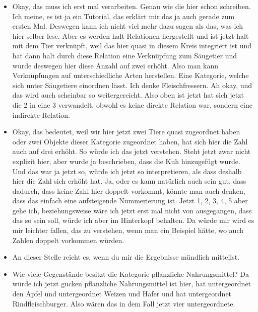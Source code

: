 {\begin{itemize}[]
            \item {} Okay, das muss ich erst mal verarbeiten.
                  Genau wie die hier schon schreiben.
                  Ich meine, es ist ja ein Tutorial, das erklärt mir das ja auch gerade zum ersten Mal.
                  Deswegen kann ich nicht viel mehr dazu sagen als das, was ich hier selber lese.
                  Aber es werden halt Relationen hergestellt und ist jetzt halt mit dem Tier verknüpft, weil das hier quasi in diesem Kreis integriert ist und hat dann halt durch diese Relation eine Verknüpfung zum Säugetier und wurde deswegen hier diese Anzahl auf zwei erhöht.
                  Also man kann Verknüpfungen auf unterschiedliche Arten herstellen.
                  Eine Kategorie, welche sich unter Säugetiere einordnen lässt.
                  Ich denke Fleischfressern. Ah okay, und das wird auch scheinbar so weitergereicht.
                  Also oben ist jetzt hat sich jetzt die 2 in eine 3 verwandelt, obwohl es keine direkte Relation war, sondern eine indirekte Relation.
            \item {} Okay, das bedeutet, weil wir hier jetzt zwei Tiere quasi zugeordnet haben oder zwei Objekte dieser Kategorie zugeordnet haben, hat sich hier die Zahl auch auf drei erhöht.
                  So würde ich das jetzt verstehen.
                  Steht jetzt zwar nicht explizit hier, aber wurde ja beschrieben, dass die Kuh hinzugefügt wurde.
                  Und das war ja jetzt so, würde ich jetzt so interpretieren, als dass deshalb hier die Zahl sich erhöht hat.
                  Ja, oder es kann natürlich auch sein gut, dass dadurch, dass keine Zahl hier doppelt vorkommt, könnte man auch denken, dass das einfach eine aufsteigende Nummerierung ist.
                  Jetzt 1, 2, 3, 4, 5 aber gehe ich, beziehungsweise wäre ich jetzt erst mal nicht von ausgegangen, dass das so sein soll, würde ich aber im Hinterkopf behalten.
                  Da würde mir wird es mir leichter fallen, das zu verstehen, wenn man ein Beispiel hätte, wo auch Zahlen doppelt vorkommen würden.
            \item {} An dieser Stelle reicht es, wenn du mir die Ergebnisse mündlich mitteilst.
            \item {} Wie viele Gegenstände besitzt die Kategorie pflanzliche Nahrungsmittel? Da würde ich jetzt gucken pflanzliche Nahrungsmittel ist hier, hat untergeordnet den Apfel und untergeordnet Weizen und Hafer und hat untergeordnet Rindfleischburger.
                  Also wären das in dem Fall jetzt vier untergeordnete.

\end{itemize}}
